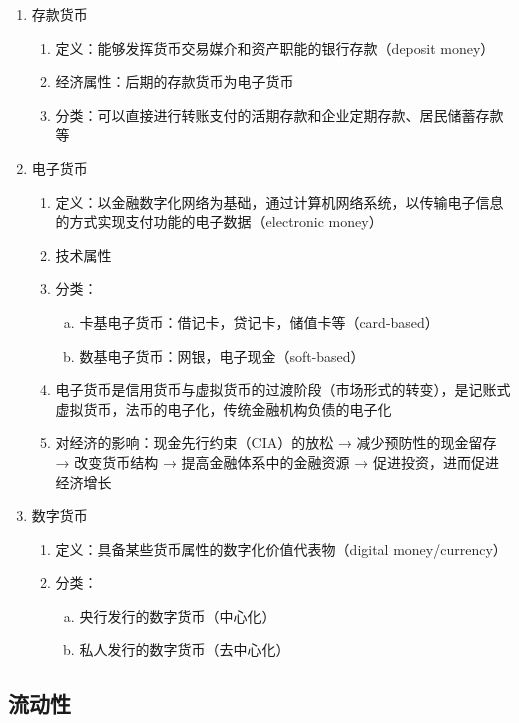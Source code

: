 \documentclass[12pt]{book}
\begin{document}
\begin{enumerate}[1.]
    \item 存款货币
\begin{enumerate}[(1)]
    \item 定义：能够发挥货币交易媒介和资产职能的银行存款（deposit money）
    \item 经济属性：后期的存款货币为电子货币
    \item 分类：可以直接进行转账支付的活期存款和企业定期存款、居民储蓄存款等
\end{enumerate}
\item 电子货币
    \begin{enumerate}[(1)]
        \item 定义：以金融数字化网络为基础，通过计算机网络系统，以传输电子信息的方式实现支付功能的电子数据（electronic money）
        \item 技术属性
        \item 分类：
        \begin{enumerate}[a.]
            \item 卡基电子货币：借记卡，贷记卡，储值卡等（card-based）
            \item 数基电子货币：网银，电子现金（soft-based）
        \end{enumerate}
        \item 电子货币是信用货币与虚拟货币的过渡阶段（市场形式的转变），是记账式虚拟货币，法币的电子化，传统金融机构负债的电子化
        \item 对经济的影响：现金先行约束（CIA）的放松 → 减少预防性的现金留存 → 改变货币结构 → 提高金融体系中的金融资源 → 促进投资，进而促进经济增长  
    \end{enumerate}
    \item 数字货币
    \begin{enumerate}[(1)]
        \item 定义：具备某些货币属性的数字化价值代表物（digital money/currency）
        \item 分类：
        \begin{enumerate}[a.]
            \item 央行发行的数字货币（中心化）
            \item 私人发行的数字货币（去中心化）
        \end{enumerate}
    \end{enumerate}
\end{enumerate}




\subsection{流动性}
\end{document}
